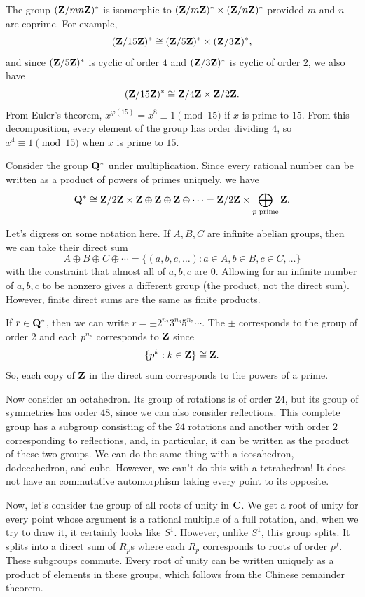 \documentclass[11pt, twoside]{amsart}
\begin{document}
The group $(\mathbf{Z}/mn\mathbf{Z})^*$ is isomorphic to $(\mathbf{Z}/m\mathbf{Z})^*\times (\mathbf{Z}/n\mathbf{Z})^*$ provided $m$ and $n$ are coprime. For example,
$$
(\mathbf{Z}/15\mathbf{Z})^* \cong (\mathbf{Z}/5\mathbf{Z})^* \times (\mathbf{Z}/3\mathbf{Z})^*,
$$ 
and since $(\mathbf{Z}/5\mathbf{Z})^*$ is cyclic of order $4$ and $(\mathbf{Z}/3\mathbf{Z})^*$ is cyclic of order $2$, we also have
$$
(\mathbf{Z}/15\mathbf{Z})^* \cong \mathbf{Z}/4\mathbf{Z} \times \mathbf{Z}/2\mathbf{Z}.
$$
From Euler's theorem, $x^{\varphi(15)} = x^8\equiv 1\pmod {15}$ if $x$ is prime to $15$. From this decomposition, every element of the group has order dividing $4$, so $x^4\equiv 1\pmod{15}$ when $x$ is prime to $15$.

Consider the group $\mathbf Q^*$ under multiplication. Since every rational number can be written as a product of powers of primes uniquely, we have 
$$
\mathbf Q^* \cong \mathbf{Z}/2\mathbf{Z} \times \mathbf{Z}\oplus \mathbf{Z} \oplus \mathbf{Z} \oplus \cdots = \mathbf{Z}/2\mathbf{Z} \times \bigoplus_{\text{$p$ prime}} \mathbf{Z}.
$$

Let's digress on some notation here. If $A,B,C$ are infinite abelian groups, then we can take their direct sum
$$
A \oplus B \oplus C \oplus \cdots = \{ (a,b,c,\hdots) : a\in A,b\in B, c\in C,\hdots\}
$$
with the constraint that almost all of $a,b,c$ are $0$. Allowing for an infinite number of $a,b,c$ to be nonzero gives a different group (the product, not the direct sum). However, finite direct sums are the same as finite products.

If $r\in \mathbf Q^*$, then we can write $r = \pm 2^{n_2} 3^{n_3} 5^{n_5}\cdots$. The $\pm$ corresponds to the group of order $2$ and each $p^{n_p}$ corresponds to $\mathbf{Z}$ since
$$
\{ p^k : k\in \mathbf{Z}\} \cong \mathbf{Z}.
$$
So, each copy of $\mathbf{Z}$ in the direct sum corresponds to the powers of a prime.

Now consider an octahedron. Its group of rotations is of order $24$, but its group of symmetries has order $48$, since we can also consider reflections. This complete group has a subgroup consisting of the $24$ rotations and another with order $2$ corresponding to reflections, and, in particular, it can be written as the product of these two groups. We can do the same thing with a icosahedron, dodecahedron, and cube. However, we can't do this with a tetrahedron! It does not have an commutative automorphism taking every point to its opposite.

Now, let's consider the group of all roots of unity in $\mathbf C$. We get a root of unity for every point whose argument is a rational multiple of a full rotation, and, when we try to draw it, it certainly looks like $S^1$. However, unlike $S^1$, this group splits. It splits into a direct sum of $R_p$s where each $R_p$ corresponds to roots of order $p^f$. These subgroups commute. Every root of unity can be written uniquely as a product of elements in these groups, which follows from the Chinese remainder theorem. 
\end{document}

